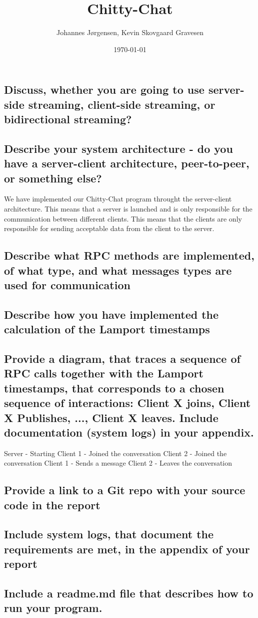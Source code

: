 \documentclass[a4paper,11pt]{article}
\title{Chitty-Chat}
\author{Johannes Jørgensen, Kevin Skovgaard Gravesen}
\date{\today}
\begin{document}
 

\maketitle

\subsection*{Discuss, whether you are going to use server-side streaming, client-side streaming, or bidirectional streaming?}
\subsection*{Describe your system architecture - do you have a server-client architecture, peer-to-peer, or something else?}
We have implemented our Chitty-Chat program throught the server-client architecture. 
This means that a server is launched and is only responsible for the communication between different clients. This means that the clients are only responsible for
sending acceptable data from the client to the server.
\subsection*{Describe what  RPC methods are implemented, of what type, and what messages types are used for communication}
\subsection*{Describe how you have implemented the calculation of the Lamport timestamps}
\subsection*{Provide a diagram, that traces a sequence of RPC calls together with the Lamport timestamps, that corresponds to a chosen sequence of interactions: Client X joins, Client X Publishes, ..., Client X leaves. Include documentation (system logs) in your appendix.}
Server   - Starting
Client 1 - Joined the conversation
Client 2 - Joined the conversation
Client 1 - Sends a message
Client 2 - Leaves the conversation
\subsection*{Provide a link to a Git repo with your source code in the report}
\subsection*{Include system logs, that document the requirements are met, in the appendix of your report}
\subsection*{Include a readme.md file that describes how to run your program.}
\end{document}
